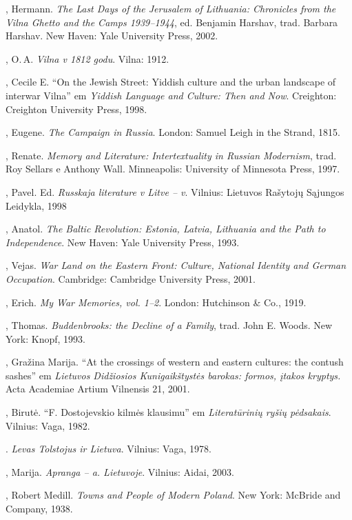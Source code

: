 \begin{bibliohedra}
  , Hermann. \emph{The Last Days of the Jerusalem of Lithuania:
  Chronicles from the Vilna Ghetto and the Camps 1939--1944}, ed.
  Benjamin Harshav, trad. Barbara Harshav. New Haven: Yale University
  Press, 2002.

  , O.\,A. \emph{Vilna v 1812 godu}. Vilna: 1912.

  , Cecile E. ``On the Jewish Street: Yiddish culture and the
  urban landscape of interwar Vilna'' em \emph{Yiddish Language and
  Culture: Then and Now}. Creighton: Creighton University Press, 1998.

  , Eugene. \emph{The Campaign in Russia}. London: Samuel Leigh
  in the Strand, 1815.

  , Renate. \emph{Memory and Literature: Intertextuality in
  Russian Modernism}, trad. Roy Sellars e Anthony Wall. Minneapolis:
  University of Minnesota Press, 1997.

  , Pavel. Ed. \emph{Russkaja literature v Litve -- v}.
  Vilnius: Lietuvos Rašytojų Sąjungos Leidykla, 1998

  , Anatol. \emph{The Baltic Revolution: Estonia, Latvia,
  Lithuania and the Path to Independence}. New Haven: Yale University
  Press, 1993.

  , Vejas. \emph{War Land on the Eastern Front: Culture,
  National Identity and German Occupation}. Cambridge: Cambridge
  University Press, 2001.

  , Erich. \emph{My War Memories, vol. 1--2}. London:
  Hutchinson \& Co., 1919.

  , Thomas. \emph{Buddenbrooks: the Decline of a Family}, trad. John
  E. Woods. New York: Knopf, 1993.

  , Gražina Marija. ``At the crossings of western and
  eastern cultures: the contush sashes'' em \emph{Lietuvos Didžiosios
  Kunigaikštystės barokas: formos, įtakos kryptys.} Acta Academiae
  Artium Vilnensis 21, 2001.

  , Birutė. ``F. Dostojevskio kilmės klausimu'' em
  \emph{Literatūrinių ryšių pėdsakais}. Vilnius: Vaga, 1982.

  \titidem. \emph{Levas Tolstojus ir Lietuva}. Vilnius: Vaga,
  1978.

  , Marija. \emph{Apranga -- a. Lietuvoje}. Vilnius:
  Aidai, 2003.

  , Robert Medill. \emph{Towns and People of Modern Poland}. New
  York: McBride and Company, 1938.


\end{bibliohedra}
